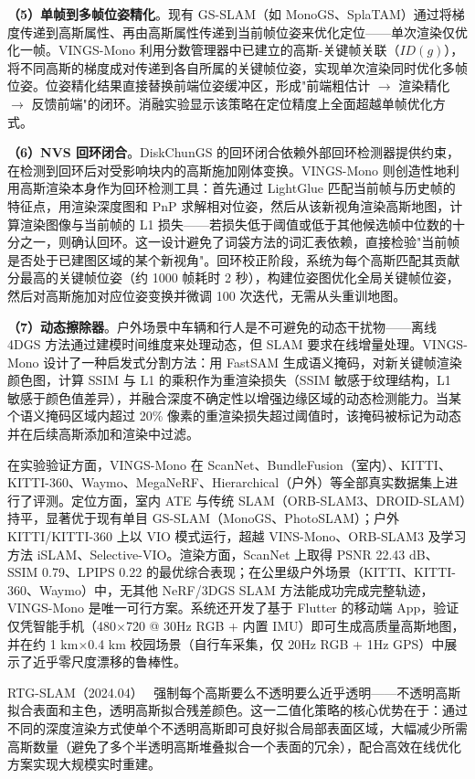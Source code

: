 \textbf{（5）单帧到多帧位姿精化}。现有 GS-SLAM（如 MonoGS、SplaTAM）通过将梯度传递到高斯属性、再由高斯属性传递到当前帧位姿来优化定位——单次渲染仅优化一帧。VINGS-Mono 利用分数管理器中已建立的高斯-关键帧关联（$ID(g)$），将不同高斯的梯度成对传递到各自所属的关键帧位姿，实现单次渲染同时优化多帧位姿。位姿精化结果直接替换前端位姿缓冲区，形成"前端粗估计 $\to$ 渲染精化 $\to$ 反馈前端"的闭环。消融实验显示该策略在定位精度上全面超越单帧优化方式。

\textbf{（6）NVS 回环闭合}。DiskChunGS 的回环闭合依赖外部回环检测器提供约束，在检测到回环后对受影响块内的高斯施加刚体变换。VINGS-Mono 则创造性地利用高斯渲染本身作为回环检测工具：首先通过 LightGlue 匹配当前帧与历史帧的特征点，用渲染深度图和 PnP 求解相对位姿，然后从该新视角渲染高斯地图，计算渲染图像与当前帧的 L1 损失——若损失低于阈值或低于其他候选帧中位数的十分之一，则确认回环。这一设计避免了词袋方法的词汇表依赖，直接检验"当前帧是否处于已建图区域的某个新视角"。回环校正阶段，系统为每个高斯匹配其贡献分最高的关键帧位姿（约 1000 帧耗时 2 秒），构建位姿图优化全局关键帧位姿，然后对高斯施加对应位姿变换并微调 100 次迭代，无需从头重训地图。

\textbf{（7）动态擦除器}。户外场景中车辆和行人是不可避免的动态干扰物——离线 4DGS 方法通过建模时间维度来处理动态，但 SLAM 要求在线增量处理。VINGS-Mono 设计了一种启发式分割方法：用 FastSAM 生成语义掩码，对新关键帧渲染颜色图，计算 SSIM 与 L1 的乘积作为重渲染损失（SSIM 敏感于纹理结构，L1 敏感于颜色值差异），并融合深度不确定性以增强边缘区域的动态检测能力。当某个语义掩码区域内超过 20\% 像素的重渲染损失超过阈值时，该掩码被标记为动态并在后续高斯添加和渲染中过滤。

在实验验证方面，VINGS-Mono 在 ScanNet、BundleFusion（室内）、KITTI、KITTI-360、Waymo、MegaNeRF、Hierarchical（户外）等全部真实数据集上进行了评测。定位方面，室内 ATE 与传统 SLAM（ORB-SLAM3、DROID-SLAM）持平，显著优于现有单目 GS-SLAM（MonoGS、PhotoSLAM）；户外 KITTI/KITTI-360 上以 VIO 模式运行，超越 VINS-Mono、ORB-SLAM3 及学习方法 iSLAM、Selective-VIO。渲染方面，ScanNet 上取得 PSNR 22.43 dB、SSIM 0.79、LPIPS 0.22 的最优综合表现；在公里级户外场景（KITTI、KITTI-360、Waymo）中，无其他 NeRF/3DGS SLAM 方法能成功完成完整轨迹，VINGS-Mono 是唯一可行方案。系统还开发了基于 Flutter 的移动端 App，验证仅凭智能手机（480$\times$720 @ 30Hz RGB + 内置 IMU）即可生成高质量高斯地图，并在约 1 km$\times$0.4 km 校园场景（自行车采集，仅 20Hz RGB + 1Hz GPS）中展示了近乎零尺度漂移的鲁棒性。

RTG-SLAM（2024.04）~\cite{2404_19706} 强制每个高斯要么不透明要么近乎透明——不透明高斯拟合表面和主色，透明高斯拟合残差颜色。这一二值化策略的核心优势在于：通过不同的深度渲染方式使单个不透明高斯即可良好拟合局部表面区域，大幅减少所需高斯数量（避免了多个半透明高斯堆叠拟合一个表面的冗余），配合高效在线优化方案实现大规模实时重建。

